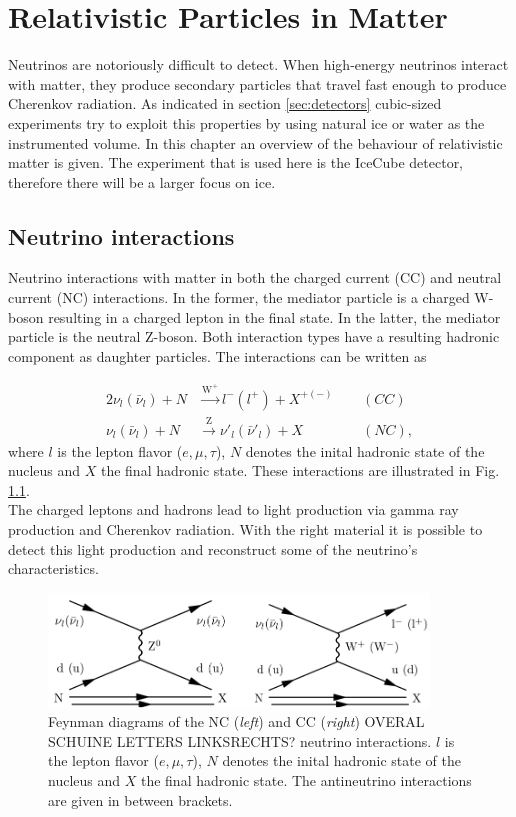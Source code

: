 \chapter{Relativistic Particles in Matter}
Neutrinos are notoriously difficult to detect. When high-energy neutrinos interact with matter, they produce secondary particles that travel fast enough to produce Cherenkov radiation. As indicated in section \ref{sec:detectors} cubic-sized experiments try to exploit this properties by using natural ice or water as the instrumented volume. In this chapter an overview of the behaviour of relativistic matter is given. The experiment that is used here is the IceCube detector, therefore there will be a larger focus on ice.

\section{Neutrino interactions}
\label{sec:neutrinointeractions}
Neutrino interactions with matter in both the charged current (CC) and neutral current (NC) interactions. In the former, the mediator particle is a charged W-boson resulting in a charged lepton in the final state. In the latter, the mediator particle is the neutral Z-boson. Both interaction types have a resulting hadronic component as daughter particles. The interactions can be written as

\begin{alignat}{2}
\nu_l \left(\bar{\nu}_l\right) + N &\xrightarrow{\text{W}^+} l^- \left(l^+\right) + X^{+\left(-\right)} \ \ && \left(CC\right)\\
\nu_l \left(\bar{\nu}_l\right) + N &\xrightarrow{\text{Z}} \nu'_l \left(\bar{\nu}'_l\right) + X && \left(NC\right),
\end{alignat}
where $l$ is the lepton flavor ($e,\mu,\tau$), $N$ denotes the inital hadronic state of the nucleus and $X$ the final hadronic state. These interactions are illustrated in Fig. \ref{fig:feynmanneutrino}.\\
\newline
The charged leptons and hadrons lead to light production via gamma ray production and Cherenkov radiation. With the right material it is possible to detect this light production and reconstruct some of the neutrino's characteristics.

\begin{figure}[t]
\label{fig:feynmanneutrino}
\centering
\includegraphics[width = 0.9\textwidth]{chapter4/img/feynmanneutrino.png}
\caption{Feynman diagrams of the NC (\textit{left}) and CC (\textit{right}) OVERAL SCHUINE LETTERS LINKSRECHTS? neutrino interactions. $l$ is the lepton flavor ($e,\mu,\tau$), $N$ denotes the inital hadronic state of the nucleus and $X$ the final hadronic state. The antineutrino interactions are given in between brackets.}
\end{figure}


